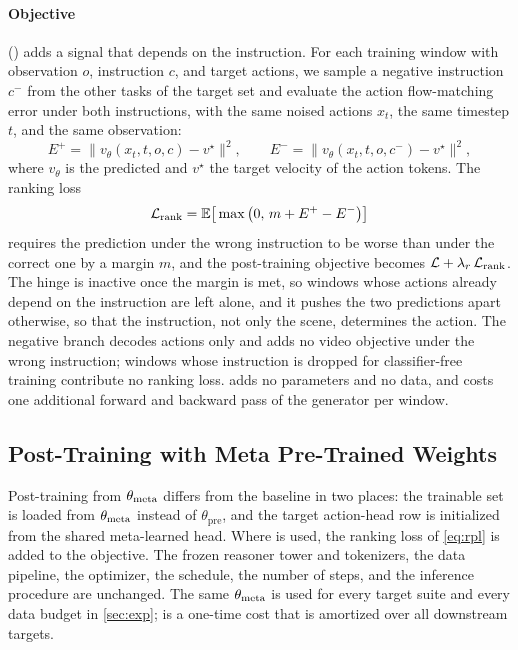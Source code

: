\paragraph{Objective}
\Rpl (\RPL) adds a signal that depends on the instruction.
For each training window with observation $o$, instruction $c$, and target actions, we sample a negative instruction $c^-$ from the other tasks of the target set and evaluate the action flow-matching error under both instructions, with the same noised actions $x_t$, the same timestep $t$, and the same observation:
\begin{equation}
  E^{+} = \big\|v_\theta(x_t,t,o,c)-v^\star\big\|^2,\qquad
  E^{-} = \big\|v_\theta(x_t,t,o,c^-)-v^\star\big\|^2,
  \label{eq:rpl_errors}
\end{equation}
where $v_\theta$ is the predicted and $v^\star$ the target velocity of the action tokens.
The ranking loss
\begin{equation}
  \mathcal{L}_{\mathrm{rank}} = \mathbb{E}\big[\max\big(0,\,m+E^{+}-E^{-}\big)\big]
  \label{eq:rpl}
\end{equation}
requires the prediction under the wrong instruction to be worse than under the correct one by a margin $m$, and the post-training objective becomes $\mathcal{L}+\lambda_r\,\mathcal{L}_{\mathrm{rank}}$.
The hinge is inactive once the margin is met, so windows whose actions already depend on the instruction are left alone, and it pushes the two predictions apart otherwise, so that the instruction, not only the scene, determines the action.
The negative branch decodes actions only and adds no video objective under the wrong instruction; windows whose instruction is dropped for classifier-free training contribute no ranking loss.
\RPL adds no parameters and no data, and costs one additional forward and backward pass of the generator per window.

\subsection{Post-Training with Meta Pre-Trained Weights}
\label{sec:downstream}

Post-training from $\theta_{\mathrm{meta}}$ differs from the baseline in two places: the trainable set is loaded from $\theta_{\mathrm{meta}}$ instead of $\theta_{\mathrm{pre}}$, and the target action-head row is initialized from the shared meta-learned head.
Where \RPL is used, the ranking loss of \cref{eq:rpl} is added to the objective.
The frozen reasoner tower and tokenizers, the data pipeline, the optimizer, the schedule, the number of steps, and the inference procedure are unchanged.
The same $\theta_{\mathrm{meta}}$ is used for every target suite and every data budget in \cref{sec:exp}; \method is a one-time cost that is amortized over all downstream targets.

